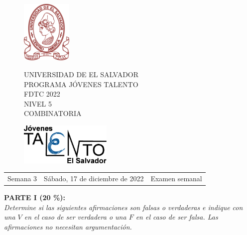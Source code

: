 \documentclass[12pt]{article}
\newcommand{\tema}{Semana 3}
\newcommand{\fecha}{Sábado, 17 de diciembre de 2022}
\newcommand{\sesion}{Examen semanal}
\begin{document}
\thispagestyle{empty}

\begin{figure}[h] 
	\begin{minipage}[b]{0.26\textwidth}
		\begin{center}
			\includegraphics[height=3cm]{Logos/UES.png}
			\par\end{center}
	\end{minipage} 
	\begin{minipage}[b]{0.46\textwidth}
		\begin{center}
			UNIVERSIDAD DE EL SALVADOR\\ [0.1cm]
			PROGRAMA JÓVENES TALENTO\\ [0.1cm]
	        FDTC 2022\\ [0.1cm]
                NIVEL 5\\ [0.1cm]
			COMBINATORIA 
			\par\end{center}
	\end{minipage} 
	\begin{minipage}[b]{0.05\textwidth}
		\begin{center}
			\includegraphics[height=2cm]{Logos/LOGO PJT.png}
			\par\end{center}
	\end{minipage}
\end{figure}

\begin{center}
    \begin{tabular}{p{4.5cm} p{7cm} p{4.5cm}}
        \tema & \centering\fecha & \hfill\sesion
    \end{tabular}
\end{center}



{\bf PARTE I (20 \%):}\\
\textit{Determine si las siguientes afirmaciones son falsas o verdaderas e indique con una $V$ en el caso de ser verdadera o una $F$ en el caso de ser falsa. Las afirmaciones no necesitan argumentación.}
\end{document}
